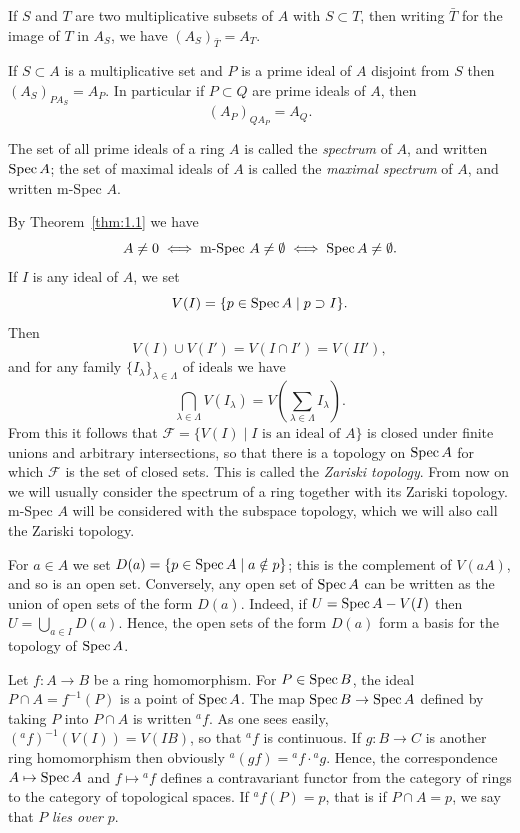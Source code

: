 \begin{corollarynum}\label{cor:4.3}
If $S$ and $T$ are two multiplicative subsets of $A$ with $S \subset T$,
then writing $\bar{T}$ for the image of $T$ in $A_S$, we have $(A_S)_{\bar{T}} = A_T$.
\end{corollarynum}

\begin{corollarynum}\label{cor:4.4}
If $S \subset A$ is a multiplicative set and $P$ is a prime ideal of $A$
disjoint from $S$ then $(A_S)_{PA_S} = A_P$. In particular if $P \subset Q$ are prime ideals of
$A$, then
\[
  (A_P)_{QA_P} = A_Q.
\]
\end{corollarynum}

\begin{definition}
The set of all prime ideals of a ring $A$ is called the \emph{spectrum}
of $A$, and written $\operatorname{Spec} A$; the set of maximal ideals of $A$ is called the
\emph{maximal spectrum} of $A$, and written m-Spec $A$.
\end{definition}

By Theorem~\ref{thm:1.1} we have
\[
  A \neq 0 \iff \text{m-Spec } A \neq \emptyset \iff \operatorname{Spec} A \neq \emptyset.
\]
If $I$ is any ideal of $A$, we set
\[
  V(I) = \{p \in \operatorname{Spec} A \mid p \supset I\}.
\]
Then
\[
  V(I) \cup V(I') = V(I \cap I') = V(II'),
\]
and for any family $\{I_\lambda\}_{\lambda \in \Lambda}$ of ideals we have
\[
  \bigcap_{\lambda \in \Lambda} V(I_\lambda) = V\left(\sum_{\lambda \in \Lambda} I_\lambda\right).
\]
From this it follows that $\mathcal{F} = \{V(I) \mid I \text{ is an ideal of } A\}$ is closed under
finite unions and arbitrary intersections, so that there is a topology on
$\operatorname{Spec} A$ for which $\mathcal{F}$ is the set of closed sets. This is called the \emph{Zariski
topology}. From now on we will usually consider the spectrum of a ring
together with its Zariski topology. m-Spec $A$ will be considered with the
subspace topology, which we will also call the Zariski topology.

For $a \in A$ we set $D(a) = \{p \in \operatorname{Spec} A \mid a \notin p\}$; this is the complement
of $V(aA)$, and so is an open set. Conversely, any open set of $\operatorname{Spec} A$ can
be written as the union of open sets of the form $D(a)$. Indeed, if
$U = \operatorname{Spec} A - V(I)$ then $U = \bigcup_{a \in I} D(a)$. Hence, the open sets of the form
$D(a)$ form a basis for the topology of $\operatorname{Spec} A$.

Let $f\colon A \to B$ be a ring homomorphism. For $P \in \operatorname{Spec} B$, the ideal
$P \cap A = f^{-1}(P)$ is a point of $\operatorname{Spec} A$. The map $\operatorname{Spec} B \to \operatorname{Spec} A$ defined by
taking $P$ into $P \cap A$ is written ${}^a f$. As one sees easily, $({}^a f)^{-1}(V(I)) = V(IB)$,
so that ${}^a f$ is continuous. If $g\colon B \to C$ is another ring homomorphism then
obviously ${}^a(gf) = {}^a f \cdot {}^a g$. Hence, the correspondence $A \mapsto \operatorname{Spec} A$ and
$f \mapsto {}^a f$ defines a contravariant functor from the category of rings to the
category of topological spaces. If ${}^a f(P) = p$, that is if $P \cap A = p$, we say
that $P$ \emph{lies over} $p$.

